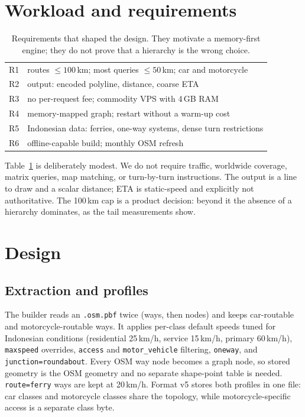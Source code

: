 \documentclass[sigconf,nonacm]{acmart}
\begin{document}
\section{Workload and requirements}
\begin{table}[t]
\small
\begin{tabular}{@{}ll@{}}
\toprule
R1 & routes $\le 100$\,km; most queries $\le 50$\,km; car and motorcycle \\
R2 & output: encoded polyline, distance, coarse ETA \\
R3 & no per-request fee; commodity VPS with 4\,GB RAM \\
R4 & memory-mapped graph; restart without a warm-up cost \\
R5 & Indonesian data: ferries, one-way systems, dense turn restrictions \\
R6 & offline-capable build; monthly OSM refresh \\
\bottomrule
\end{tabular}
\caption{Requirements that shaped the design. They motivate a memory-first
engine; they do not prove that a hierarchy is the wrong choice.}
\label{tab:req}
\end{table}

Table~\ref{tab:req} is deliberately modest. We do not require traffic, worldwide
coverage, matrix queries, map matching, or turn-by-turn instructions. The output
is a line to draw and a scalar distance; ETA is static-speed and explicitly not
authoritative. The 100\,km cap is a product decision: beyond it the absence of a
hierarchy dominates, as the tail measurements show.

\section{Design}
\subsection{Extraction and profiles}
The builder reads an \texttt{.osm.pbf} twice (ways, then nodes) and keeps
car-routable and motorcycle-routable ways. It applies per-class default speeds
tuned for Indonesian conditions (residential 25\,km/h, service 15\,km/h, primary
60\,km/h), \texttt{maxspeed} overrides, \texttt{access} and
\texttt{motor\_vehicle} filtering, \texttt{oneway}, and
\texttt{junction=roundabout}. Every OSM way node becomes a graph node, so stored
geometry is the OSM geometry and no separate shape-point table is needed.
\texttt{route=ferry} ways are kept at 20\,km/h. Format v5 stores both profiles in
one file: car classes and motorcycle classes share the topology, while
motorcycle-specific access is a separate class byte.
\end{document}
